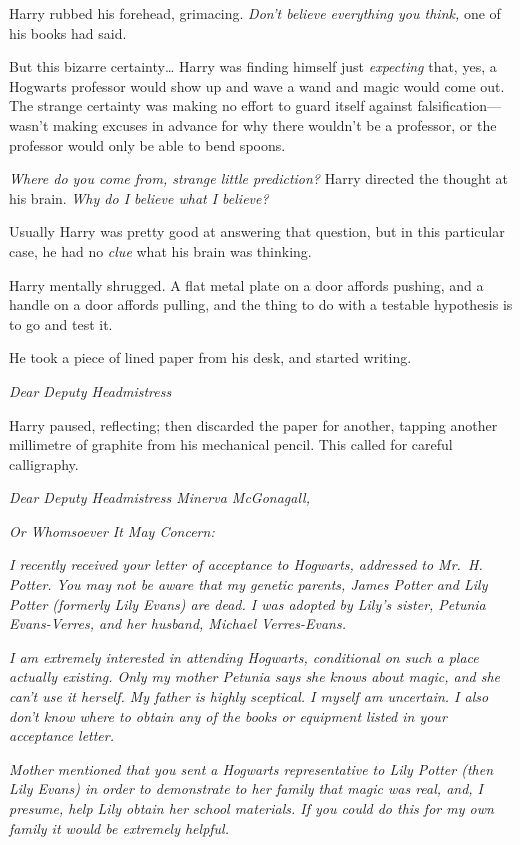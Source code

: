 Harry rubbed his forehead, grimacing. \emph{Don't believe everything you 
think,} one of his books had said.

But this bizarre certainty{\ldots} Harry was finding himself just 
\emph{expecting} that, yes, a Hogwarts professor would show up and wave a wand 
and magic would come out. The strange certainty was making no effort to guard 
itself against falsification---wasn't making excuses in advance for why there 
wouldn't be a professor, or the professor would only be able to bend spoons.

\emph{Where do you come from, strange little prediction?} Harry directed the 
thought at his brain. \emph{Why do I believe what I believe?}

Usually Harry was pretty good at answering that question, but in this 
particular case, he had no \emph{clue} what his brain was thinking.

Harry mentally shrugged. A flat metal plate on a door affords pushing, and a 
handle on a door affords pulling, and the thing to do with a testable 
hypothesis is to go and test it.

He took a piece of lined paper from his desk, and started writing.

\emph{Dear Deputy Headmistress}

Harry paused, reflecting; then discarded the paper for another, tapping another 
millimetre of graphite from his mechanical pencil. This called for careful 
calligraphy.

\emph{Dear Deputy Headmistress Minerva McGonagall,}

\emph{Or Whomsoever It May Concern:}

\emph{I recently received your letter of acceptance to Hogwarts, addressed to 
Mr.~H. Potter. You may not be aware that my genetic parents, James Potter and 
Lily Potter (formerly Lily Evans) are dead. I was adopted by Lily's sister, 
Petunia Evans-Verres, and her husband, Michael Verres-Evans.}

\emph{I am extremely interested in attending Hogwarts, conditional on such a 
place actually existing. Only my mother Petunia says she knows about magic, and 
she can't use it herself. My father is highly sceptical. I myself am uncertain. 
I also don't know where to obtain any of the books or equipment listed in your 
acceptance letter.}

\emph{Mother mentioned that you sent a Hogwarts representative to Lily Potter 
(then Lily Evans) in order to demonstrate to her family that magic was real, 
and, I presume, help Lily obtain her school materials. If you could do this for 
my own family it would be extremely helpful.}

